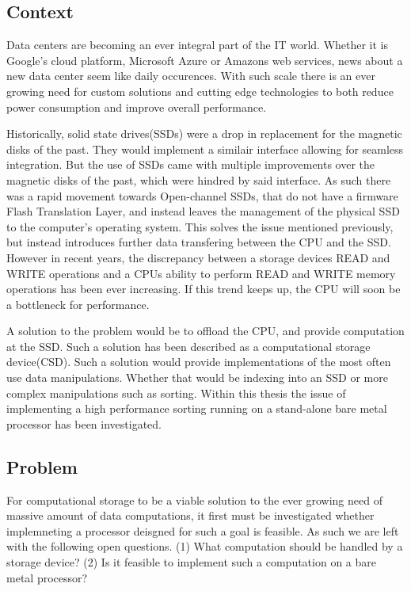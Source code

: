 \subsection{Context}\label{sec:context}
Data centers are becoming an ever integral part of the IT world. Whether it is
Google's cloud platform, Microsoft Azure or Amazons web services, news about a
new data center seem like daily occurences. With such scale there is an ever
growing need for custom solutions and cutting edge technologies to both reduce
power consumption and improve overall performance.

Historically, solid state drives(SSDs) were a drop in replacement for the
magnetic disks of the past. They would implement a similair interface allowing
for seamless integration. But the use of SSDs came with multiple improvements
over the magnetic disks of the past, which were hindred by said interface. As
such there was a rapid movement towards Open-channel SSDs, that do not have a
firmware Flash Translation Layer, and instead leaves the management of the
physical SSD to the computer's operating system. This solves the issue mentioned
previously, but instead introduces further data transfering between the CPU and
the SSD. However in recent years, the discrepancy between a storage devices
READ and WRITE operations and a CPUs ability to perform READ and WRITE memory
operations has been ever increasing. If this trend keeps up, the CPU will soon
be a bottleneck for performance.

A solution to the problem would be to offload the CPU, and provide computation
at the SSD. Such a solution has been described as a computational storage
device(CSD). Such a solution would provide implementations of the most often use
data manipulations. Whether that would be indexing into an SSD or more complex
manipulations such as sorting. Within this thesis the issue of implementing a
high performance sorting running on a stand-alone bare metal processor has been
investigated.


\subsection{Problem}
For computational storage to be a viable solution to the ever growing need of
massive amount of data computations, it first must be investigated whether
implemneting a processor deisgned for such a goal is feasible. As such we are
left with the following open questions. (1) What computation should be handled
by a storage device? (2) Is it feasible to implement such a computation on a
bare metal processor?

